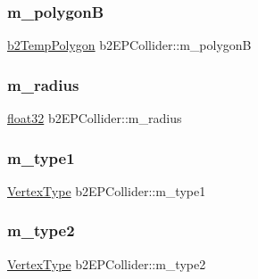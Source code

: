 \subsubsection{\texorpdfstring{m\_polygonB}{m\_polygonB}}
{\footnotesize\ttfamily \mbox{\hyperlink{structb2_temp_polygon}{b2\+Temp\+Polygon}} b2\+E\+P\+Collider\+::m\+\_\+polygonB}

\mbox{\label{structb2_e_p_collider_a1efd359a8c17680bbdef093dd07fbb9d}} 
\subsubsection{\texorpdfstring{m\_radius}{m\_radius}}
{\footnotesize\ttfamily \mbox{\hyperlink{b2_settings_8h_aacdc525d6f7bddb3ae95d5c311bd06a1}{float32}} b2\+E\+P\+Collider\+::m\+\_\+radius}

\mbox{\label{structb2_e_p_collider_ad2541e4c9358d5ffcaca19b25836392b}} 
\subsubsection{\texorpdfstring{m\_type1}{m\_type1}}
{\footnotesize\ttfamily \mbox{\hyperlink{structb2_e_p_collider_aa50efcaf41cf85e167d0244f5d6f00e8}{Vertex\+Type}} b2\+E\+P\+Collider\+::m\+\_\+type1}

\mbox{\label{structb2_e_p_collider_a71889f34bef412e3cbfbbab605210b7e}} 
\subsubsection{\texorpdfstring{m\_type2}{m\_type2}}
{\footnotesize\ttfamily \mbox{\hyperlink{structb2_e_p_collider_aa50efcaf41cf85e167d0244f5d6f00e8}{Vertex\+Type}} b2\+E\+P\+Collider\+::m\+\_\+type2}

\mbox{\label{structb2_e_p_collider_a5da77944d10d87ca7222e3d8d00ac205}} 
